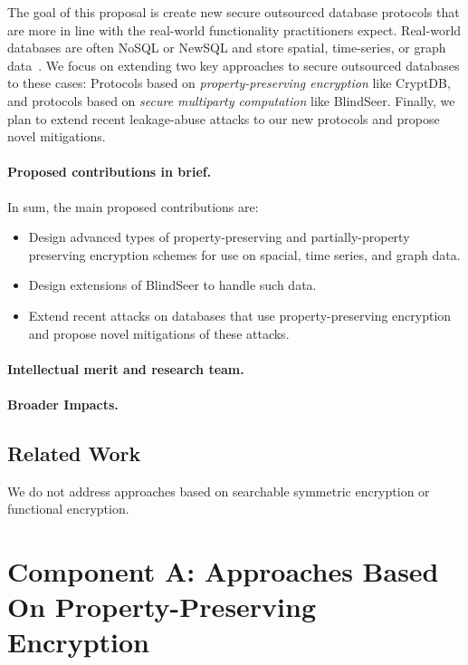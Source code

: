 \documentclass[11pt]{article}
\theoremstyle{remark}
\begin{document}
The goal of this proposal is create new secure outsourced database protocols that are more in line with the real-world functionality practitioners expect.  Real-world databases are often NoSQL or NewSQL and store spatial, time-series, or graph data~\cite{fuller2017sok}.  We focus on extending two key approaches to secure outsourced databases to these cases: Protocols based on \emph{property-preserving encryption} like CryptDB, and protocols based on \emph{secure multiparty computation} like BlindSeer.  Finally, we plan to extend recent leakage-abuse attacks to our new protocols and propose novel mitigations.

\paragraph*{Proposed contributions in brief.}
In sum, the main proposed contributions are:
\begin{itemize}
\item Design advanced types of property-preserving and partially-property preserving encryption schemes for use on spacial, time series, and graph data.
\item Design extensions of BlindSeer to handle such data.
\item Extend recent attacks on databases that use property-preserving encryption and propose novel mitigations of these attacks. 
\end{itemize}

\paragraph*{Intellectual merit and research team.}  

 \paragraph*{Broader Impacts.}

\subsection{Related Work}

We do not address approaches based on searchable symmetric encryption or functional encryption.  

\section{Component A:  Approaches Based On Property-Preserving Encryption}
\end{document}
